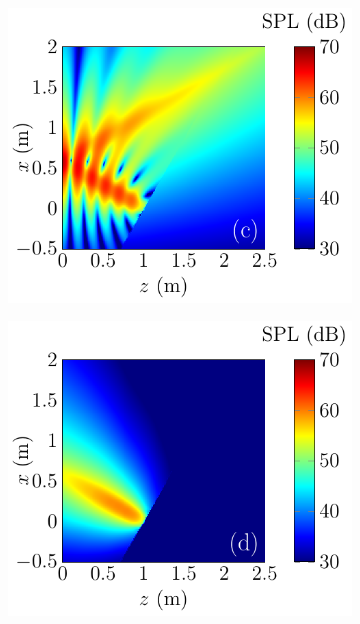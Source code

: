 \begin{figure}[!htb]
\begin{subfigure}{0.32\textwidth}
    \end{subfigure}
    \begin{subfigure}{0.32\textwidth}
        \centering
        \includegraphics[width = \textwidth]{fig/ComputePalReflectionTruncated_Ultra100000_LocSurface1m_Absorp0_Total_211013Ab.pdf}
    \end{subfigure}
    \begin{subfigure}{0.32\textwidth}
        \centering
        \includegraphics[width = \textwidth]{fig/ComputePalReflectionTruncated_Ultra200000_LocSurface1m_Absorp0_Orignal_211013Ac.pdf}

\end{subfigure}
\end{figure}
